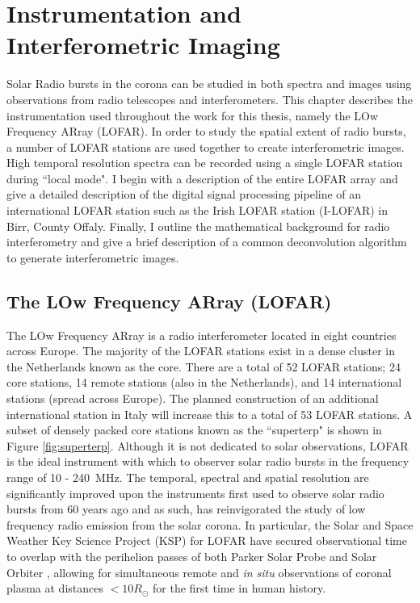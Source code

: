\doublespacing
\chapter{Instrumentation and Interferometric Imaging}
\label{chap:instrumentation}
Solar Radio bursts in the corona can be studied in both spectra and images using observations from radio telescopes and interferometers. This chapter describes the instrumentation used throughout the work for this thesis, namely the LOw Frequency ARray (LOFAR). In order to study the spatial extent of radio bursts, a number of LOFAR stations are used together to create interferometric images.  High temporal resolution spectra can be recorded using a single LOFAR station during ``local mode". I begin with a description of the entire LOFAR array and give a detailed description of the digital signal processing pipeline of an international LOFAR station such as the Irish LOFAR station (I-LOFAR) in Birr, County Offaly. 
Finally, I outline the mathematical background for radio interferometry and give a brief description of a common deconvolution algorithm to generate interferometric images.

\section{The LOw Frequency ARray (LOFAR)}
The LOw Frequency ARray \citep[LOFAR;][]{VanHaarlem2013} is a radio interferometer located in eight countries across Europe. The majority of the LOFAR stations exist in a dense cluster in the Netherlands known as the core. There are a total of 52 LOFAR stations; 24 core stations, 14 remote stations (also in the Netherlands), and 14 international stations (spread across Europe). The planned construction of an additional international station in Italy will increase this to a total of 53 LOFAR stations. A subset of densely packed core stations known as the ``superterp" is shown in Figure \ref{fig:superterp}. Although it is not dedicated to solar observations, LOFAR is the ideal instrument with which to observer solar radio bursts in the frequency range of 10 - 240~MHz. The temporal, spectral and spatial resolution are significantly improved upon the instruments first used to observe solar radio bursts from 60 years ago and as such, has reinvigorated the study of low frequency radio emission from the solar corona. In particular, the Solar and Space Weather Key Science Project (KSP) for LOFAR have secured observational time to overlap with the perihelion passes of both Parker Solar Probe \citep[PSP;][]{Fox2016} and Solar Orbiter \citep{Muller2020}, allowing for simultaneous remote and \textit{in situ} observations of coronal plasma at distances $< 10 R_\odot$ for the first time in human history.

